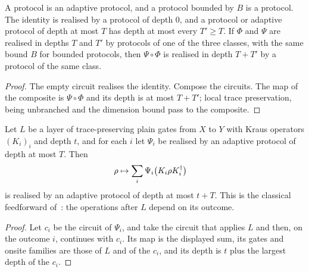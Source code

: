 \begin{theorem}
    \label{thm:protocols_comp}
    \leanok
    A protocol is an adaptive protocol, and a protocol bounded by $B$ is a protocol. The
    identity is realised by a protocol of depth $0$, and a protocol or adaptive protocol of
    depth at most $T$ has depth at most every $T'\ge T$. If $\Phi$
    and $\Psi$ are realised in depths $T$ and $T'$ by protocols of one of the three classes,
    with the same bound $B$ for bounded protocols, then $\Psi\circ\Phi$ is realised in depth
    $T+T'$ by a protocol of the same class.
\end{theorem}
\begin{proof}\leanok
    The empty circuit realises the identity. Compose the circuits. The map of the composite is $\Psi\circ\Phi$ and its depth is at
    most $T+T'$; local trace preservation, being unbranched and the dimension bound pass to the
    composite.
\end{proof}

\begin{lemma}
    \label{lem:protocols_feedforward}
    \leanok
    Let $L$ be a layer of trace-preserving plain gates from $X$ to $Y$ with Kraus operators
    $(K_i)_i$ and depth $t$, and for each $i$ let $\Psi_i$ be realised by an adaptive
    protocol of depth at most $T$. Then
    \begin{align}
        \rho&\mapsto\sum_i\Psi_i\bigl(K_i\rho K_i^\dagger\bigr)
        \notag
    \end{align}
    is realised by an adaptive protocol of depth at most $t+T$. This is the classical
    feedforward of~\cite{Piroli2021LOCC}: the operations after $L$ depend on its outcome.
\end{lemma}
\begin{proof}\leanok
    Let $c_i$ be the circuit of $\Psi_i$, and take the circuit that applies $L$ and then,
    on the outcome $i$, continues with $c_i$. Its map is the displayed sum, its gates and
    onsite families are those of $L$ and of the $c_i$, and its depth is $t$ plus the largest
    depth of the $c_i$.
\end{proof}


